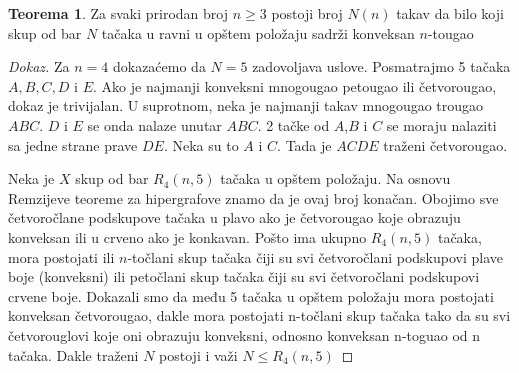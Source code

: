 \documentclass{article}
\theoremstyle{definition}
\newtheorem{teorema}{Teorema}[section]
\newcommand{\dokaz}[1]{\begin{proof}[Dokaz]#1\end{proof}}
\begin{document}
	\begin{teorema} \label{happyEnding}
		Za svaki prirodan broj $n\geq 3$ postoji broj $N(n)$ takav da bilo koji skup od bar $N$ tačaka u ravni u opštem položaju sadrži konveksan $n$-tougao
	\end{teorema}
	\dokaz{
		Za $n=4$ dokazaćemo da $N=5$ zadovoljava uslove. Posmatrajmo 5 tačaka $A,B,C,D$ i $E$. Ako je najmanji konveksni mnogougao petougao ili četvorougao, dokaz je trivijalan. U suprotnom, neka je najmanji takav mnogougao trougao $ABC$. $D$ i $E$ se onda nalaze unutar $ABC$. 2 tačke od $A$,$B$ i $C$ se moraju nalaziti sa jedne strane prave $DE$. Neka su to $A$ i $C$. Tada je $ACDE$ traženi četvorougao.
		
		Neka je $X$ skup od bar $R_4(n,5)$ tačaka u opštem položaju. Na osnovu Remzijeve teoreme za hipergrafove znamo da je ovaj broj konačan. Obojimo sve četvoročlane podskupove tačaka u plavo ako je četvorougao koje obrazuju konveksan ili u crveno ako je konkavan. Pošto ima ukupno $R_{4}(n,5)$ tačaka, mora postojati ili $n$-točlani skup tačaka čiji su svi četvoročlani podskupovi plave boje (konveksni) ili petočlani skup tačaka čiji su svi četvoročlani podskupovi crvene boje. Dokazali smo da među 5 tačaka u opštem položaju mora postojati konveksan četvorougao, dakle mora postojati n-točlani skup tačaka tako da su svi četvorouglovi koje oni obrazuju konveksni, odnosno konveksan n-toguao od n tačaka. Dakle traženi $N$ postoji i važi $N\leq R_{4}(n,5)$
		
	}
	
\end{document}
